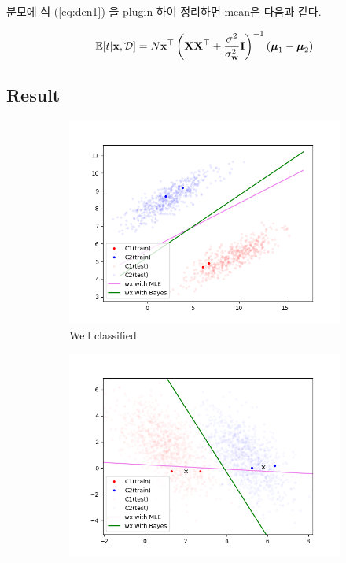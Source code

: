 \documentclass{article} %
\begin{document}
분모에 식 (\ref{eq:den1}) 을 plugin 하여 정리하면 mean은 다음과 같다.

\begin{equation}
	\mathbb{E}[t | {\bf x}, {\cal D}] = N{\bf x}^\top \left(
	{\bf X}{\bf X}^\top + \dfrac{\sigma^2}{\sigma^2_{\bf w}} {\bf I}
	\right)^{-1} (\boldsymbol{\mu}_1 - \boldsymbol{\mu}_2)
	\label{eq:mean}
\end{equation}

\subsection{Result}

\begin{figure}[ht]
\begin{subfigure}{.5\textwidth}
	\centering
	\includegraphics[width=\textwidth]{Figure_4.png}
	\caption{Well classified}
	\label{fg:fda1}
\end{subfigure}
\begin{subfigure}{.5\textwidth}
	\centering
	\includegraphics[width=\textwidth]{Figure_7.png}

\end{subfigure}
\end{figure}
\end{document}
